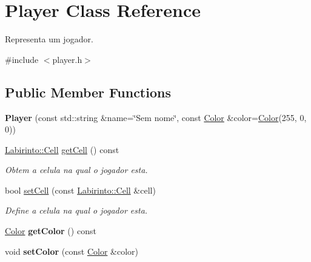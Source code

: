 \hypertarget{class_player}{}\section{Player Class Reference}
\label{class_player}


Representa um jogador.  




{\ttfamily \#include $<$player.\+h$>$}

\subsection*{Public Member Functions}
\begin{DoxyCompactItemize}
\item 
\hypertarget{class_player_a32aad167b7d41694952c3731c5e55ea4}{}{\bfseries Player} (const std\+::string \&name=\char`\"{}Sem nome\char`\"{}, const \hyperlink{class_color}{Color} \&color=\hyperlink{class_color}{Color}(255, 0, 0))\label{class_player_a32aad167b7d41694952c3731c5e55ea4}

\item 
\hyperlink{struct_labirinto_1_1_cell}{Labirinto\+::\+Cell} \hyperlink{class_player_ac080f98d0b6ab04f07e2e2e65868c11c}{get\+Cell} () const 
\begin{DoxyCompactList}\small\item\em Obtem a celula na qual o jogador esta. \end{DoxyCompactList}\item 
bool \hyperlink{class_player_a7b7a8bf62f14126e4b8baf8ef087ac97}{set\+Cell} (const \hyperlink{struct_labirinto_1_1_cell}{Labirinto\+::\+Cell} \&cell)
\begin{DoxyCompactList}\small\item\em Define a celula na qual o jogador esta. \end{DoxyCompactList}\item 
\hypertarget{class_player_a3660536cb21311d5480df9a2dc8b051a}{}\hyperlink{class_color}{Color} {\bfseries get\+Color} () const \label{class_player_a3660536cb21311d5480df9a2dc8b051a}

\item 
\hypertarget{class_player_a647e6a411f2fb94dce137307a5d9785e}{}void {\bfseries set\+Color} (const \hyperlink{class_color}{Color} \&color)\label{class_player_a647e6a411f2fb94dce137307a5d9785e}

\end{DoxyCompactItemize}


